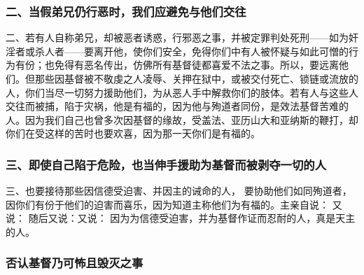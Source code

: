 \subsubsection{二、当假弟兄仍行恶时，我们应避免与他们交往}

二、若有人自称弟兄，却被恶者诱惑，行邪恶之事，并被定罪判处死刑——如为奸淫者或杀人者——要离开他，使你们安全，免得你们中有人被怀疑与如此可憎的行为有份；也免得有恶名传出，仿佛所有基督徒都喜爱不法之事。所以，要远离他们。但那些因基督被不敬虔之人凌辱、关押在狱中，或被交付死亡、锁链或流放的人，你们当尽一切努力援助他们，为从恶人手中解救你们的肢体。若有人与这些人交往而被捕，陷于灾祸，他是有福的，因为他与殉道者同份，是效法基督苦难的人。因为我们自己也曾多次因基督的缘故，受盖法、亚历山大和亚纳斯的鞭打，却你们在受这样的苦时也要欢喜，因为那一天你们是有福的。\par


\subsubsection{三、即使自己陷于危险，也当伸手援助为基督而被剥夺一切的人}

三、也要接待那些因信德受迫害、并因主的诫命的人， 要协助他们如同殉道者，因你们有份于他们的迫害而喜乐，因为知道主称他们为有福的。主亲自说： 又说： 随后又说：又说： 因为为信德受迫害，并为基督作证而忍耐的人，真是天主的人。\par


\subsubsection{否认基督乃可怖且毁灭之事}

